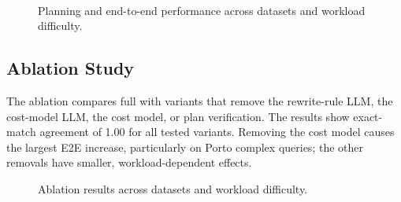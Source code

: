 \begin{figure}[!htbp]
\centering
\begin{minipage}[t]{0.31\textwidth}\centering
{}
\end{minipage}\hfill
\begin{minipage}[t]{0.31\textwidth}\centering
{}
\end{minipage}\hfill
\begin{minipage}[t]{0.31\textwidth}\centering
{}
\end{minipage}\\[4pt]
\begin{minipage}[t]{0.31\textwidth}\centering
{}
\end{minipage}\hfill
\begin{minipage}[t]{0.31\textwidth}\centering
{}
\end{minipage}\hfill
\begin{minipage}[t]{0.31\textwidth}\centering
{}
\end{minipage}
\caption{Planning and end-to-end performance across datasets and workload difficulty.}\label{fig:exp-overall-e2e}
\end{figure}
\FloatBarrier

\subsection{Ablation Study}\label{sec:exp-ablation}

The ablation compares full \KART{} with variants that remove the rewrite-rule LLM, the cost-model LLM, the cost model, or plan verification.
  The results show exact-match agreement of 1.00 for all tested variants. Removing the cost model causes the largest E2E increase, particularly on Porto complex queries; the other removals have smaller, workload-dependent effects.

\begin{figure}[!htbp]
\centering
\begin{minipage}[t]{0.48\textwidth}\centering
{}
\end{minipage}\hfill
\begin{minipage}[t]{0.48\textwidth}\centering
{}
\end{minipage}
\caption{Ablation results across datasets and workload difficulty.}\label{fig:exp-ablation}
\end{figure}
\FloatBarrier

